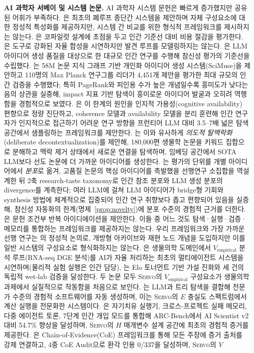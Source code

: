 \documentclass[11pt]{article}
\newcommand{\framework}{\textsc{Servo}}
\begin{document}
\textbf{AI 과학자 서베이 및 시스템 논문.} AI 과학자 시스템 문헌은 빠르게 증가했지만 공유된 어휘가 부족하다. \citet{lu2024aiscientist}은 최초의 폐루프 종단간 시스템을 제안하며 자체 구성요소에 대한 정성적 특성화를 제공하지만, 시스템 간 비교를 위한 형식적 프레임워크를 제시하지는 않는다. \citet{schmidgall2025agentlab}은 코파일럿 설계에 초점을 두고 인간 기준선 대비 비용 절감을 평가한다. \citet{boiko2023emergent}은 도구로 강화된 자율 합성을 시연하지만 발견 루프를 모델링하지는 않는다. \citet{si2024novelideas}은 LLM 아이디어 생성 품질을 대상으로 한 대규모 인간 연구를 수행해 참신성 평가의 기준선을 수립했다. \citet{gu2024scimuse}는 58M 논문 지식 그래프 기반 개인화 아이디어 생성 시스템(SciMuse)을 제안하고 110명의 Max Planck 연구그룹 리더가 4,451개 제안을 평가한 최대 규모의 인간 검증을 수행했다; 특히 PageRank와 피인용 수가 높은 개념일수록 흥미도가 낮다는 음의 상관을 실증해, impact 지표 기반 탐색이 흥미로운 아이디어 발굴과 오히려 역행함을 경험적으로 보였다. \citet{artiles2026alienspace}은 이 한계의 원인을 인지적 가용성(cognitive availability) 편향으로 정량 진단하고, coherence 모델과 availability 모델을 분리 훈련해 인간 연구자가 인지적으로 접근하기 어려운 연구 방향을 프런티어 LLM 대비 3.5--7배 넓은 탐색 공간에서 샘플링하는 프레임워크를 제안한다. \citet{lee2025spacer}는 이와 유사하게 \textit{의도적 탈맥락화}(deliberate decontextualization)를 제안해, 180,000편 생물학 논문을 키워드 집합으로 분해하고 맥락 제거 상태에서 새로운 연결을 탐색하며, 임베딩 공간에서 SOTA LLM보다 선도 논문에 더 가까운 아이디어를 생성한다. \citet{chen2026gap}는 평가의 단위를 개별 아이디어에서 \emph{분포}로 옮겨, 고품질 논문의 핵심 아이디어를 촉발했을 선행연구 소집합을 역설계한 뒤 2축 research-taste taxonomy로 인간 참조 분포와 LLM 생성 분포의 divergence를 계측한다; 여러 LLM에 걸쳐 LLM 아이디어가 bridge형 기회와 synthesis 방법에 체계적으로 집중되어 인간 연구 취향보다 좁고 편향되어 있음을 실증해, 참신성 자동화의 한계(명제~\ref{prop:novelty})에 분포 수준의 경험적 근거를 더한다. \citet{baek2024researchagent}은 문헌 조건부 반복 아이디에이션을 제안한다. 이들 중 어느 것도 탐색·실행·검증·메모리를 통합하는 프레임워크를 제공하지는 않는다. 우리 프레임워크와 가장 가까운 선행 연구는 \citet{lu2026aiscientist}의 정성적 논의로, 개방형 아카이브와 재현 노드 개념을 도입하지만 이를 일반 시스템의 구성요소로 형식화하지는 않는다. \citet{ghareeb2026robin}은 생물의학 도메인에서 $V_\text{empirical}$ 분석 루프(RNA-seq DGE 분석)를 AI가 자율 처리하는 최초의 멀티에이전트 시스템을 시연하며(물리적 실험 실행은 인간 담당), \citet{gottweis2026coscientist}는 Elo 토너먼트 기반 가설 진화와 세 건의 독립적 wet-lab 검증을 달성한다. 두 논문 모두 \framework{}의 $V_\text{empirical}$ 구성요소가 생물의학 과제에서 실질적으로 작동함을 처음으로 보인다. \citet{aygun2026era}는 LLM과 트리 탐색을 결합해 전문가 수준의 경험적 소프트웨어를 자동 생성하며, 이는 \framework{}의 $E$ 충실도 스펙트럼에서 계산 실행을 전문화한 시스템이다. \citet{liu2026autoresearchclaw}은 자기치유 실행기, 크로스-프로젝트 실패 메모리, 다중 에이전트 토론, 7단계 인간 개입 모드를 통합해 ARC-Bench에서 AI Scientist v2 대비 54.7\% 향상을 달성하며, \framework{}의 $H$ 매개변수 설계 공간에 최초의 경험적 증거를 제공한다. \citet{meng2026scientistone}은 Chain-of-Evidence(CoE) 프레임워크를 통해 모든 주장에 증거 출처를 강제 연결하고, 4중 CoE Audit으로 환각 인용 0/337을 달성하며, \framework{}의 $V$ 
\end{document}
